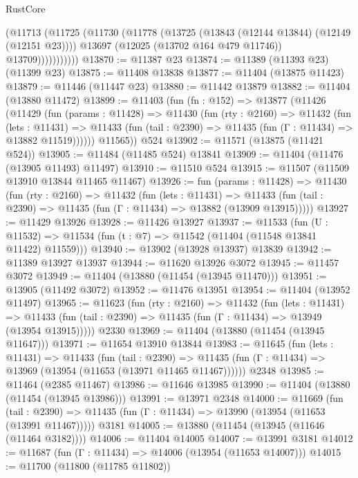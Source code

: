 \begin{lexlean}{RustCore}
\begin{coremodule}
                  (@11713
                    (@11725
                      (@11730
                        (@11778
                          (@13725 (@13843 (@12144 @13844) (@12149 (@12151 @23))))
                          @13697
                          (@12025 (@13702 @164 @479 @11746))
                          @13709)))))))))))
@13870 := @11387 @23
@13874 := @11389 (@11393 @23) (@11399 @23)
@13875 := @11408 @13838
@13877 := @11404 (@13875 @11423)
@13879 := @11446 (@11447 @23)
@13880 := @11442 @13879
@13882 := @11404 (@13880 @11472)
@13899 := @11403
    (fun (fn : @152) =>
    @13877
      (@11426
        (@11429
          (fun (params : @11428) =>
          @11430
            (fun (rty : @2160) =>
            @11432
              (fun (lets : @11431) =>
              @11433 (fun (tail : @2390) => @11435 (fun (Γ : @11434) => @13882 @11519))))))
        @11565))
    @524
@13902 := @11571 (@13875 (@11421 @524))
@13905 := @11484 (@11485 @524) @13841
@13909 := @11404 (@11476 (@13905 @11493) @11497)
@13910 := @11510 @524
@13915 := @11507 (@11509 @13910 @13844 @11465 @11467)
@13926 := fun (params : @11428) =>
  @11430
    (fun (rty : @2160) =>
    @11432
      (fun (lets : @11431) =>
      @11433 (fun (tail : @2390) => @11435 (fun (Γ : @11434) => @13882 (@13909 @13915)))))
@13927 := @11429 @13926
@13928 := @11426 @13927
@13937 := @11533
    (fun (U : @11532) => @11534 (fun (t : @7) => @11542 (@11404 (@11548 @13841 @11422) @11559)))
@13940 := @13902 (@13928 @13937) @13839
@13942 := @11389 @13927 @13937
@13944 := @11620 @13926 @3072
@13945 := @11457 @3072
@13949 := @11404 (@13880 (@11454 (@13945 @11470)))
@13951 := @13905 (@11492 @3072)
@13952 := @11476 @13951
@13954 := @11404 (@13952 @11497)
@13965 := @11623
    (fun (rty : @2160) =>
    @11432
      (fun (lets : @11431) =>
      @11433 (fun (tail : @2390) => @11435 (fun (Γ : @11434) => @13949 (@13954 @13915)))))
    @2330
@13969 := @11404 (@13880 (@11454 (@13945 @11647)))
@13971 := @11654 @13910 @13844
@13983 := @11645
    (fun (lets : @11431) =>
    @11433
      (fun (tail : @2390) =>
      @11435 (fun (Γ : @11434) => @13969 (@13954 (@11653 (@13971 @11465 @11467))))))
    @2348
@13985 := @11464 (@2385 @11467)
@13986 := @11646 @13985
@13990 := @11404 (@13880 (@11454 (@13945 @13986)))
@13991 := @13971 @2348
@14000 := @11669
    (fun (tail : @2390) => @11435 (fun (Γ : @11434) => @13990 (@13954 (@11653 (@13991 @11467)))))
    @3181
@14005 := @13880 (@11454 (@13945 (@11646 (@11464 @3182))))
@14006 := @11404 @14005
@14007 := @13991 @3181
@14012 := @11687 (fun (Γ : @11434) => @14006 (@13954 (@11653 @14007)))
@14015 := @11700 (@11800 (@11785 @11802))

\end{coremodule}
\end{lexlean}
